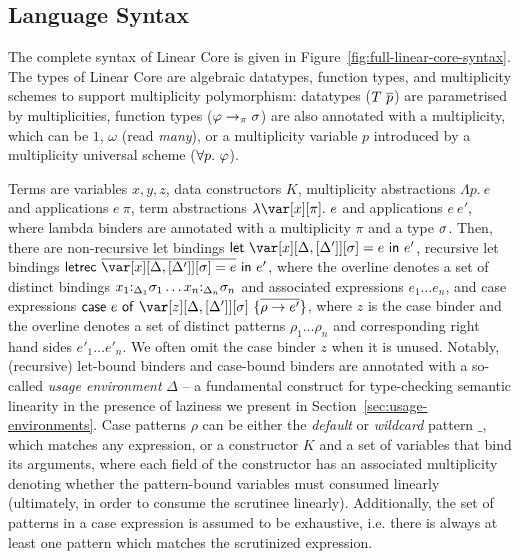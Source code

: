 \documentclass[acmsmall,review,anonymous,screen]{acmart}
\newcommand{\llet}[2]{\mathsf{let}~#1~\mathsf{in}~#2}
\newcommand{\lletrec}[2]{\mathsf{letrec}~#1~\mathsf{in}~#2}
\newcommand{\ccase}[2]{\mathsf{case}~#1~\mathsf{of}~#2}
\begin{document}
%


\subsection{Language Syntax}

The complete syntax of Linear Core is given in Figure~\ref{fig:full-linear-core-syntax}.
%
The types of Linear Core are algebraic datatypes, function types, and
multiplicity schemes to support multiplicity polymorphism: datatypes
($T~\overline{p}$) are parametrised by multiplicities, function types
($\varphi\to_\pi\sigma$) are also annotated with a multiplicity, which can be $1$,
$\omega$ (read \emph{many}), or a multiplicity variable $p$ introduced by a
multiplicity universal scheme ($\forall p.~\varphi$).
%

%
Terms are variables $x,y,z$, data constructors $K$, multiplicity
abstractions $\Lambda p.~e$ and applications $e~\pi$, term abstractions
$\lambda \x[\pi].~e$ and applications $e~e'$, where lambda binders are
annotated with a multiplicity $\pi$ and a type $\sigma$. Then, there are
non-recursive let bindings $\llet{\xD = e}{e'}$, recursive let bindings
$\lletrec{\ov{\xD = e}}{e'}$, where the overline denotes a set of distinct
bindings $x_1{:}_{\Delta_1}\sigma_1\dots x_n{:}_{\Delta_n}\sigma_n$ and associated expressions
$e_1\dots e_n$, and case expressions $\ccase{e}{\zD~\{\ov{\rho \to e'}\}}$,
where $z$ is the case binder and the overline denotes a set of distinct
patterns $\rho_1\dots \rho_n$ and corresponding right hand sides $e'_1\dots
e'_n$. We often omit the case binder $z$ when it is unused. Notably, (recursive) let-bound
binders and case-bound binders are annotated
with a so-called \emph{usage environment} $\Delta$ -- a fundamental construct
for type-checking semantic linearity in the presence of laziness we present in
Section~\ref{sec:usage-environments}.
%
Case patterns $\rho$ can be either the \emph{default} or \emph{wildcard}
pattern $\_$, which matches any expression, or a constructor $K$ and a set of
variables that bind its arguments, where each field of the constructor has an
associated multiplicity denoting whether the pattern-bound variables must
consumed linearly (ultimately, in order to consume the scrutinee linearly).
Additionally, the set of patterns in a case expression is assumed to be exhaustive,
i.e. there is always at least one pattern which matches the scrutinized expression.
\end{document}

